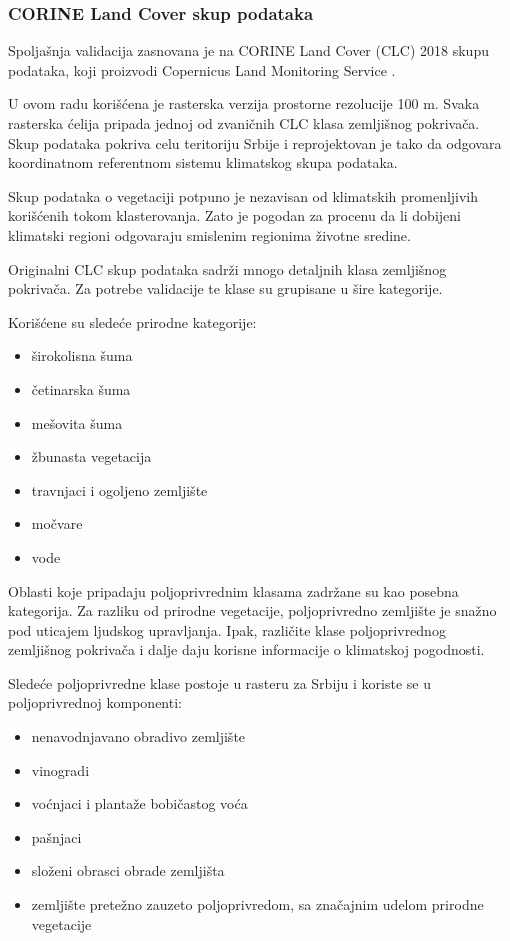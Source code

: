 \documentclass[11pt]{article}
\begin{document}
\subsubsection{CORINE Land Cover skup podataka}
Spoljašnja validacija zasnovana je na CORINE Land Cover (CLC) 2018 skupu podataka, koji proizvodi Copernicus Land Monitoring Service \cite{copernicusCLC2018,clcManual2021}.

U ovom radu korišćena je rasterska verzija prostorne rezolucije 100 m. Svaka rasterska ćelija pripada jednoj od zvaničnih CLC klasa zemljišnog pokrivača. Skup podataka pokriva celu teritoriju Srbije i reprojektovan je tako da odgovara koordinatnom referentnom sistemu klimatskog skupa podataka.

Skup podataka o vegetaciji potpuno je nezavisan od klimatskih promenljivih korišćenih tokom klasterovanja. Zato je pogodan za procenu da li dobijeni klimatski regioni odgovaraju smislenim regionima životne sredine.

Originalni CLC skup podataka sadrži mnogo detaljnih klasa zemljišnog pokrivača. Za potrebe validacije te klase su grupisane u šire kategorije.

Korišćene su sledeće prirodne kategorije:
\begin{itemize}
  \item širokolisna šuma
  \item četinarska šuma
  \item mešovita šuma
  \item žbunasta vegetacija
  \item travnjaci i ogoljeno zemljište
  \item močvare
  \item vode
\end{itemize}

Oblasti koje pripadaju poljoprivrednim klasama zadržane su kao posebna kategorija. Za razliku od prirodne vegetacije, poljoprivredno zemljište je snažno pod uticajem ljudskog upravljanja. Ipak, različite klase poljoprivrednog zemljišnog pokrivača i dalje daju korisne informacije o klimatskoj pogodnosti.

Sledeće poljoprivredne klase postoje u rasteru za Srbiju i koriste se u poljoprivrednoj komponenti:
\begin{itemize}
  \item nenavodnjavano obradivo zemljište
  \item vinogradi
  \item voćnjaci i plantaže bobičastog voća
  \item pašnjaci
  \item složeni obrasci obrade zemljišta
  \item zemljište pretežno zauzeto poljoprivredom, sa značajnim udelom prirodne vegetacije
\end{itemize}
\end{document}
